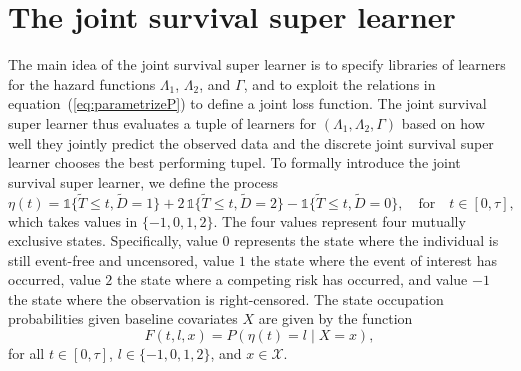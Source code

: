 \documentclass[lineno]{biometrika}
\newcommand{\1}{\mathds{1}}
\begin{document}
\section{The joint survival super learner}
\label{sec:joint-survival-super-learner}

The main idea of the joint survival super learner is to specify
libraries of learners for the hazard functions \( \Lambda_1 \), \(
\Lambda_2 \), and \( \Gamma \), and to exploit the relations in
equation~(\ref{eq:parametrizeP}) to define a joint loss function. The
joint survival super learner thus evaluates a tuple of learners for \(
(\Lambda_1, \Lambda_2, \Gamma) \) based on how well they jointly
predict the observed data and the discrete joint survival super
learner chooses the best performing tupel. To formally introduce the
joint survival super learner, we define the process
\begin{equation*}
  \eta(t) = \1\{\tilde{T} \leq t, \tilde D=1\} + 2\,\1\{\tilde{T} \leq t, \tilde
  D=2\} - \1\{\tilde{T} \leq t, \tilde D=0\},
  \quad \text{for} \quad t \in [0, \tau],
\end{equation*}
which takes values in \( \{-1,0,1,2\}\). The four values
represent four mutually exclusive states. Specifically, value
\( 0 \) represents the state where the individual is still
event-free and uncensored, value \( 1\) the state where the
event of interest has occurred, value \( 2\) the state where a
competing risk has occurred, and value \( -1\) the state where
the observation is right-censored. The state occupation
probabilities given baseline covariates \( X \) are given by
the function
\begin{equation}
  \label{eq:F-def}
  F(t, l, x) = P(\eta(t) = l \mid X=x),
\end{equation}
for all \( t \in [0,\tau] \), \( l \in \{-1,0,1,2\} \), and
\( x \in \mathcal{X} \).
\end{document}
